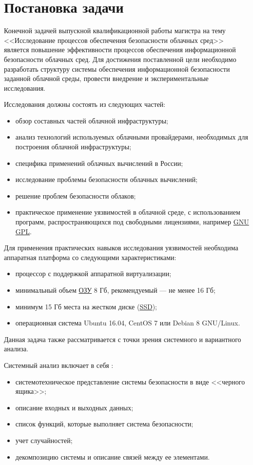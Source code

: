 \section{Постановка задачи}

Конечной задачей выпускной квалификационной работы магистра на тему <<Исследование процессов обеспечения безопасности облачных сред>> является повышение эффективности процессов обеспечения информационной безопасности облачных сред.
Для достижения поставленной цели необходимо разработать структуру системы обеспечения информационной безопасности  заданной облачной среды, провести внедрение и экспериментальные исследования.

Исследования должны состоять из следующих частей:
\begin{itemize}
  \item обзор составных частей облачной инфраструктуры;
  \item анализ технологий используемых облачными провайдерами, необходимых для построения облачной инфраструктуры;
  \item специфика применений облачных вычислений в России;
  \item исследование проблемы безопасности облачных вычислений;
  \item решение проблем безопасности облаков;
  \item практическое применение уязвимостей в облачной среде, с использованием программ, распространяющихся под свободными лицензиями, например \hyperlink{gnu}{GNU} \hyperlink{gpl}{GPL}.
\end{itemize}

Для применения практических навыков исследования уязвимостей необходима аппаратная платформа со следующими характеристиками:
\begin{itemize}
  \item процессор с поддержкой аппаратной виртуализации;
  \item минимальный объем \hyperlink{ram}{ОЗУ} 8 Гб, рекомендуемый --- не менее 16 Гб;
  \item минимум 15 Гб места на жестком диске (\hyperlink{ssd}{SSD});
  \item операционная система Ubuntu 16.04, CentOS 7 или Debian 8 GNU/Linux.
\end{itemize}

Данная задача также рассматривается с точки зрения системного и вариантного анализа.

Системный анализ включает в себя \cite{sys-analyz}:
\begin{itemize}
  \item системотехническое представление системы безопасности в виде <<черного ящика>>;
  \item описание входных и выходных данных;
  \item список функций, которые выполняет система безопасности;
  \item учет случайностей;
  \item декомпозицию системы и описание связей между ее элементами.
\end{itemize}


